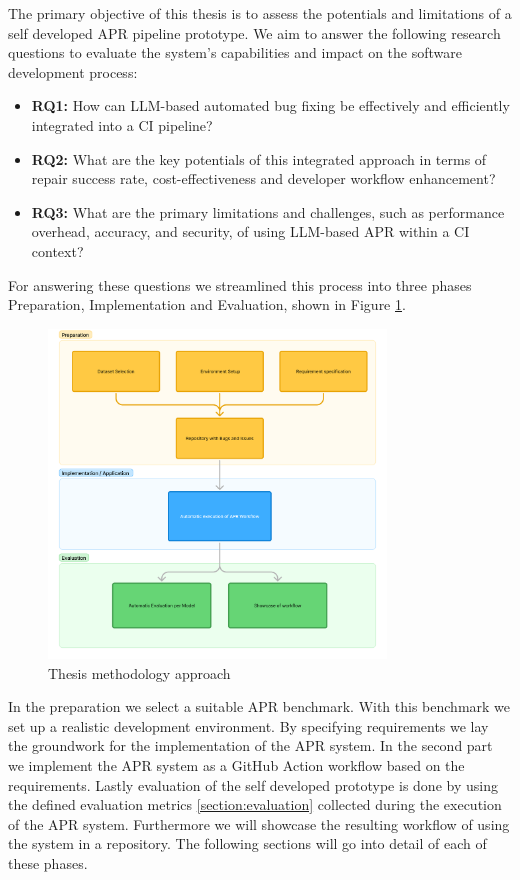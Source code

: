 The primary objective of this thesis is to assess the potentials and limitations of a self developed APR pipeline prototype. We aim to answer the following research questions to evaluate the system's capabilities and impact on the software development process:

\begin{itemize}
    \item \textbf{RQ1:} How can LLM-based automated bug fixing be effectively and efficiently integrated into a CI pipeline?
    \item \textbf{RQ2:} What are the key potentials of this integrated approach in terms of repair success rate, cost-effectiveness and developer workflow enhancement?
    \item \textbf{RQ3:} What are the primary limitations and challenges, such as performance overhead, accuracy, and security, of using LLM-based APR within a CI context?
\end{itemize}

For answering these questions we streamlined this process into three phases Preparation, Implementation and Evaluation, shown in Figure \ref{fig:method-overview}.

\begin{figure}[H]
    \centering
    \includegraphics[width=0.8\textwidth]{images/flowcharts/method.png}
    \caption{Thesis methodology approach}
    \label{fig:method-overview}
\end{figure}

In the preparation we select a suitable APR benchmark. With this benchmark we set up a realistic development environment. By specifying requirements we lay the groundwork for the implementation of the APR system.
In the second part we implement the APR system as a GitHub Action workflow based on the requirements.
Lastly evaluation of the self developed prototype is done by using the defined evaluation metrics \ref{section:evaluation} collected during the execution of the APR system. Furthermore we will showcase the resulting workflow of using the system in a repository.
The following sections will go into detail of each of these phases.

